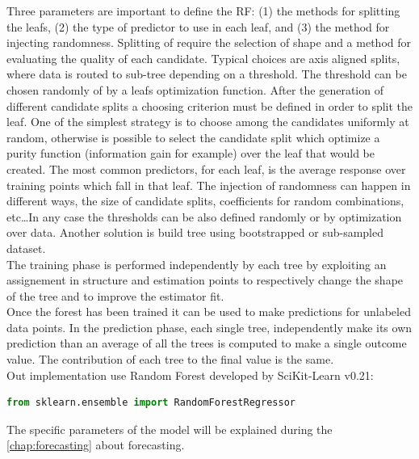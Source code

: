 \documentclass[%
    corpo=12pt,
    twoside,
    oldstyle,
    autoretitolo,
    greek,
    evenboxes,
]{toptesi}
\begin{document}
Three parameters are important to define the RF: (1) the methods for splitting the leafs, (2) the type of predictor to use in each leaf, and (3) the method for injecting randomness.
Splitting of require the selection of shape and a method for evaluating the quality of each candidate. Typical choices are axis aligned splits, where data is routed to sub-tree depending on a threshold. The threshold can be chosen randomly of by a leafs optimization function. After the generation of different candidate splits a choosing criterion must be defined in order to split the leaf. One of the simplest strategy is to choose among the candidates uniformly at random, otherwise is possible to select the candidate split which optimize a purity function (information gain for example) over the leaf that would be created.
The most common predictors, for each leaf, is the average response over training points which fall in that leaf.
The injection of randomness can happen in different ways, the size of candidate splits, coefficients for random combinations, etc\dots In any case the thresholds can be also defined randomly or by optimization over data. Another solution is build tree using bootstrapped or sub-sampled dataset.\\
The training phase is performed independently by each tree by exploiting an assignement in structure and estimation points to respectively change the shape of the tree and to improve the estimator fit.\\
Once the forest has been trained it can be used to make predictions for unlabeled data points. In the prediction phase, each single tree, independently make its own prediction than an average of all the trees is computed to make a single outcome value. The contribution of each tree to the final value is the same.\\
Out implementation use Random Forest developed by SciKit-Learn v0.21:
\begin{lstlisting}[language=python, frame=single]
  from sklearn.ensemble import RandomForestRegressor
\end{lstlisting}
The specific parameters of the model will be explained during the \autoref{chap:forecasting} about forecasting.
\end{document}
